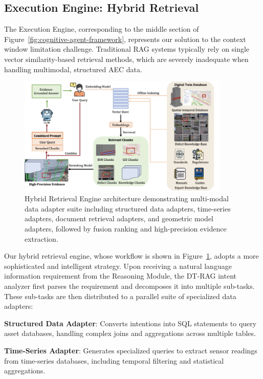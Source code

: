 \subsection{Execution Engine: Hybrid Retrieval}

The Execution Engine, corresponding to the middle section of Figure~\ref{fig:cognitive-agent-framework}, represents our solution to the context window limitation challenge. Traditional RAG systems typically rely on single vector similarity-based retrieval methods, which are severely inadequate when handling multimodal, structured AEC data.

\begin{figure}[htbp]
\centering
\includegraphics[width=0.9\textwidth]{figures/DefectGPT/Hybrid Retrieval Engine.png}
\caption{Hybrid Retrieval Engine architecture demonstrating multi-modal data adapter suite including structured data adapters, time-series adapters, document retrieval adapters, and geometric model adapters, followed by fusion ranking and high-precision evidence extraction.}
\label{fig:hybrid-retrieval-engine}
\end{figure}

Our hybrid retrieval engine, whose workflow is shown in Figure~\ref{fig:hybrid-retrieval-engine}, adopts a more sophisticated and intelligent strategy. Upon receiving a natural language information requirement from the Reasoning Module, the DT-RAG intent analyzer first parses the requirement and decomposes it into multiple sub-tasks. These sub-tasks are then distributed to a parallel suite of specialized data adapters:

\textbf{Structured Data Adapter}: Converts intentions into SQL statements to query asset databases, handling complex joins and aggregations across multiple tables.

\textbf{Time-Series Adapter}: Generates specialized queries to extract sensor readings from time-series databases, including temporal filtering and statistical aggregations.

